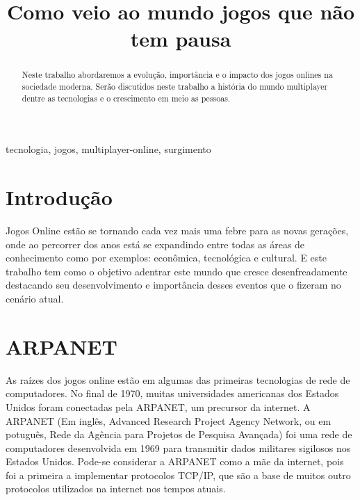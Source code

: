\documentclass[conference]{ModeloA}
\begin{document}
\title{Como veio ao mundo jogos que não tem pausa}

\author{
\and
}


\maketitle
\begin{abstract}
	Neste trabalho abordaremos a evolução, importância e o impacto dos jogos onlines na sociedade moderna. Serão discutidos neste trabalho a história do mundo multiplayer dentre as tecnologias e o crescimento em meio as pessoas.
\end{abstract}

\begin{IEEEkeywords}
tecnologia, jogos, multiplayer-online, surgimento
\end{IEEEkeywords}


\section{Introdução}
Jogos Online estão se tornando cada vez mais uma febre para as novas gerações, onde ao percorrer dos anos está se expandindo entre todas as áreas de conhecimento como por exemplos: econômica, tecnológica e cultural. E este trabalho tem como o objetivo adentrar este mundo que cresce desenfreadamente destacando seu desenvolvimento e importância desses eventos que o fizeram no cenário atual.


\section{ARPANET}
As raízes dos jogos online estão em algumas das primeiras tecnologias de rede de computadores. No final de 1970, muitas universidades americanas dos Estados Unidos foram conectadas pela ARPANET, um precursor da internet. A ARPANET (Em inglês, Advanced Research Project Agency Network, ou em potuguês, Rede da Agência para Projetos de Pesquisa Avançada) foi uma rede de computadores desenvolvida em 1969 para transmitir dados militares sigilosos nos Estados Unidos. Pode-se considerar a ARPANET como a mãe da internet, pois foi a primeira a implementar protocolos TCP/IP, que são a base de muitos outro protocolos utilizados na internet nos tempos atuais.
\cite{WikipediaArpanet}
\end{document}

